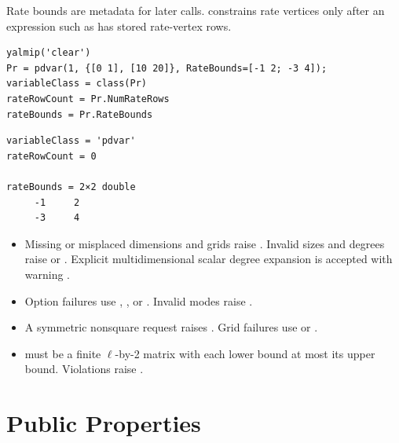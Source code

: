 \shortpairspace
Rate bounds are metadata for later  calls.   constrains rate vertices only after an expression such as  has stored rate-vertex rows.

\begin{lstlisting}[style=dpmatlab]
yalmip('clear')
Pr = pdvar(1, {[0 1], [10 20]}, RateBounds=[-1 2; -3 4]);
variableClass = class(Pr)
rateRowCount = Pr.NumRateRows
rateBounds = Pr.RateBounds
\end{lstlisting}

\begin{lstlisting}[style=dpoutput]
variableClass = 'pdvar'
rateRowCount = 0

rateBounds = 2×2 double
     -1     2
     -3     4
\end{lstlisting}

\remarkshead
\begin{itemize}[leftmargin=*]
  \item Missing or misplaced dimensions and grids raise . Invalid sizes and degrees raise \allowbreak{} or . Explicit multidimensional scalar degree expansion is accepted with warning . \item Option failures use \allowbreak{}, \allowbreak{}, or \allowbreak{}. Invalid modes raise \allowbreak{}. \item A symmetric nonsquare request raises . Grid failures use  or \allowbreak{}. \item {} must be a finite $\ell$-by-2 matrix with each lower bound at most its upper bound. Violations raise \allowbreak{}.
\end{itemize}

\section{Public Properties}
\label{sec:pdvar-properties}

